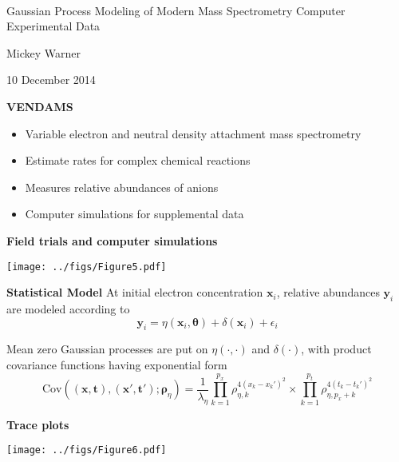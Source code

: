 \documentclass[mathserif, 11pt, t]{beamer}
\newcommand{\m}[1]{\mathbf{\bm{#1}}}
\renewcommand{\subtitle}[1]{\vspace{0.45cm}\textcolor{bluegreen}{
    {\textbf{#1}}}\vspace{0.15cm}\newline}
\begin{document}
\begin{center}
\ \\ [-0.5in]
\vfill
\bigskip
\bigskip
\bigskip
\bigskip
\bigskip

\begin{LARGE}
\begin{center}
Gaussian Process Modeling of Modern Mass Spectrometry Computer Experimental Data
\end{center}
\end{LARGE}
\vfill

\begin{center}
Mickey Warner
\end{center}
\vfill
10 December 2014
\bigskip
\bigskip
\bigskip
\vfill
\ \\ [-0.5in]
\end{center}

\begin{frame}
\subtitle{VENDAMS}
\begin{itemize}[label={$\cdot$}]
\item Variable electron and neutral density attachment mass spectrometry
\item Estimate rates for complex chemical reactions
\item Measures relative abundances of anions
\item Computer simulations for supplemental data
\end{itemize}
\end{frame}

\begin{frame}
\subtitle{Field trials and computer simulations}
\begin{center}
\texttt{[image: ../figs/Figure5.pdf]}
\end{center}
\end{frame}

\begin{frame}
\subtitle{Statistical Model}
At initial electron concentration $\m{x}_i$, relative abundances $\m{y}_i$ are modeled according to
\[\m{y}_i = \eta(\m{x}_i, \m{\theta}) + \delta(\m{x}_i) + \epsilon_i\]

Mean zero Gaussian processes are put on $\eta(\cdot, \cdot)$ and $\delta(\cdot)$, with product covariance functions having exponential form
\[ \mathrm{Cov}((\m{x},\m{t}),(\m{x}',\m{t}'); \m{\rho}_\eta) = \frac{1}{\lambda_\eta}\prod_{k=1}^{p_x}\rho_{\eta,k}^{4(x_k-x_k')^2}\times\prod_{k=1}^{p_t}\rho_{\eta,p_x+k}^{4(t_k-t_k')^2} \]
\end{frame}

\begin{frame}
\subtitle{Trace plots}
\begin{center}
\texttt{[image: ../figs/Figure6.pdf]}
\end{center}
\end{frame}
\end{document}
